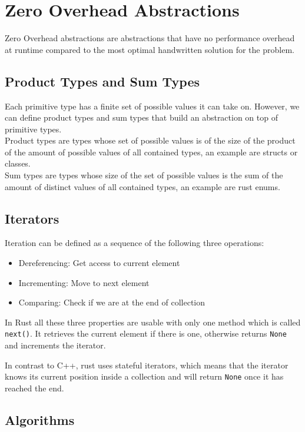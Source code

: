 \section{Zero Overhead Abstractions}

Zero Overhead abstractions are abstractions that have no performance overhead at runtime compared to the most optimal handwritten solution for the problem.

\subsection{Product Types and Sum Types}

Each primitive type has a finite set of possible values it can take on. However, we can define product types and sum types that build an abstraction on top of primitive types.\\
Product types are types whose set of possible values is of the size of the product of the amount of possible values of all contained types, an example are structs or classes.\\
Sum types are types whose size of the set of possible values is the sum of the amount of distinct values of all contained types, an example are rust enums.

\subsection{Iterators}

Iteration can be defined as a sequence of the following three operations:

\begin{itemize}
    \item Dereferencing: Get access to current element
    \item Incrementing: Move to next element
    \item Comparing: Check if we are at the end of collection
\end{itemize}

In Rust all these three properties are usable with only one method which is called \lstinline{next()}. It retrieves the current element if there is one, otherwise returns \lstinline{None} and increments the iterator.

In contrast to C++, rust uses stateful iterators, which means that the iterator knows its current position inside a collection and will return \lstinline{None} once it has reached the end.

\subsection{Algorithms}

